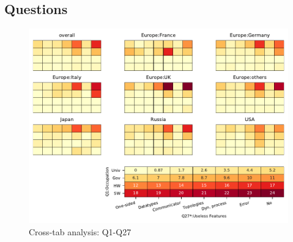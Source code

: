 
\subsection{Questions}


\begin{figure}
\begin{center}
\includegraphics[width=12cm]{../pdfs/Q1-Q27.pdf}
\caption{Cross-tab analysis: Q1-Q27}
\label{fig:Q1-Q27}
\end{center}
\end{figure}
